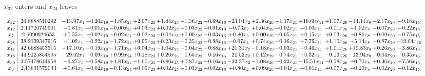 \documentclass[9pt]{article}
\begin{document}
 $ x_{32} $ enters and $ x_{24} $ leaves 

 \[\begin{array}{c| c c@{\hskip 2pt} c@{\hskip 2pt} c@{\hskip 2pt} c@{\hskip 2pt} c@{\hskip 2pt} c@{\hskip 2pt} c@{\hskip 2pt} c@{\hskip 2pt} c@{\hskip 2pt} c@{\hskip 2pt} c@{\hskip 2pt} c@{\hskip 2pt} c@{\hskip 2pt} c@{\hskip 2pt} c@{\hskip 2pt} }
 x_{32}   &  20.8888510292 & -13.97 x_{1} & -0.20 x_{19} & -1.85 x_{24} & +  2.97 x_{23} & +  1.44 x_{25} & -1.36 x_{22} & -0.69 x_{16} & -23.04 x_{2} & +  2.36 x_{29} & -1.17 x_{21} & + 19.60 x_{11} & +  1.07 x_{26} & -14.14 x_{8} & -2.17 x_{20} & -9.18 x_{15}\\
 x_{12}   &  2.11720749991 & -0.81 x_{1} & +  0.01 x_{19} & -0.00 x_{24} & +  0.03 x_{23} & +  0.02 x_{25} & -0.03 x_{22} & +  0.01 x_{16} & -0.73 x_{2} & +  0.04 x_{29} & -0.02 x_{21} & +  0.00 x_{11} & -0.01 x_{26} & -1.02 x_{8} & -0.07 x_{20} & -0.22 x_{15}\\
 x_{7}   &  2.6090924653 & +  0.55 x_{1} & -0.02 x_{19} & -0.02 x_{24} & -0.02 x_{23} & -0.04 x_{25} & +  0.00 x_{22} & -0.03 x_{16} & +  0.80 x_{2} & +  0.00 x_{29} & +  0.05 x_{21} & +  0.15 x_{11} & +  0.03 x_{26} & +  0.86 x_{8} & -0.00 x_{20} & -0.75 x_{15}\\
 x_{28}   &  38.2139347916 & -1.02 x_{1} & -0.22 x_{19} & -1.72 x_{24} & +  0.95 x_{23} & +  0.23 x_{25} & -0.35 x_{22} & -0.88 x_{16} & -0.07 x_{2} & +  0.74 x_{29} & -0.16 x_{21} & +  7.76 x_{11} & +  1.10 x_{26} & +  5.14 x_{8} & -0.87 x_{20} & -12.64 x_{15}\\
 x_{17}   &  42.6688453515 & + 17.10 x_{1} & -0.19 x_{19} & -1.71 x_{24} & +  0.04 x_{23} & -1.04 x_{25} & -0.04 x_{22} & -0.88 x_{16} & + 21.31 x_{2} & -0.18 x_{29} & +  0.03 x_{21} & -0.46 x_{11} & +  1.01 x_{26} & + 19.83 x_{8} & +  0.26 x_{20} & -3.86 x_{15}\\
 x_{18}   &  44.9125854595 & -29.62 x_{1} & -0.09 x_{19} & +  0.99 x_{24} & +  0.18 x_{23} & +  0.26 x_{25} & -0.65 x_{22} & +  0.16 x_{16} & -21.53 x_{2} & +  0.12 x_{29} & -0.74 x_{21} & +  0.32 x_{11} & -0.13 x_{26} & -13.94 x_{8} & -0.64 x_{20} & -0.35 x_{15}\\
 x_{30}   &  2.57478644958 & -6.27 x_{1} & +  0.58 x_{19} & +  1.81 x_{24} & -1.60 x_{23} & -0.86 x_{25} & +  0.87 x_{22} & +  0.16 x_{16} & -22.37 x_{2} & -1.08 x_{29} & +  0.22 x_{21} & -15.51 x_{11} & -0.58 x_{26} & +  0.70 x_{8} & +  0.46 x_{20} & +  7.56 x_{15}\\
 x_{9}   &  2.13631579033 & +  0.61 x_{1} & -0.02 x_{19} & -0.13 x_{24} & +  0.09 x_{23} & +  0.02 x_{25} & -0.03 x_{22} & -0.02 x_{16} & +  0.80 x_{2} & +  0.09 x_{29} & -0.04 x_{21} & +  0.61 x_{11} & +  0.07 x_{26} & -0.20 x_{8} & -0.02 x_{20} & -0.12 x_{15}\\

\end{array}\]
\end{document}
